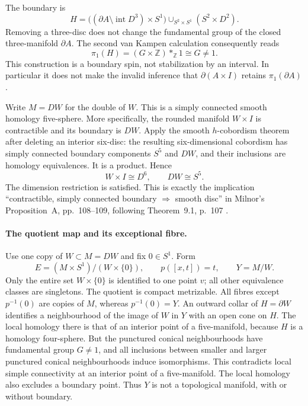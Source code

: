 The boundary is
\[
 H=\bigl((\partial A\setminus\operatorname{int}D^3)\times S^1\bigr)
       \mathop{\cup}_{S^2\times S^1}(S^2\times D^2).
 \tag{C5H.2}
\]
Removing a three-disc does not change the fundamental group of the closed
three-manifold $\partial A$.  The second van Kampen calculation consequently
reads
\[
 \pi_1(H)=(G\times\mathbb Z)*_{\mathbb Z}1\cong G\ne1.
\]
This construction is a boundary spin, not stabilization by an interval.
In particular it does not make the invalid inference that
$\partial(A\times I)$ retains $\pi_1(\partial A)$.

Write $M=DW$ for the double of $W$.  This is a simply connected smooth
homology five-sphere.  More specifically, the rounded manifold $W\times I$
is contractible and its boundary is $DW$.  Apply the smooth $h$-cobordism
theorem after deleting an interior six-disc: the resulting six-dimensional
cobordism has simply connected boundary components $S^5$ and $DW$, and their
inclusions are homology equivalences.  It is a product.  Hence
\[
 W\times I\cong D^6,\qquad DW\cong S^5.
 \tag{C5H.3}
\]
The dimension restriction is satisfied.  This is exactly the implication
``contractible, simply connected boundary $\Rightarrow$ smooth disc'' in
Milnor's Proposition~A, pp.~108--109, following Theorem~9.1, p.~107
\cite[\S9]{C5HMilnor1965}.

\paragraph{The quotient map and its exceptional fibre.}
Use one copy of $W\subset M=DW$ and fix $0\in S^1$.  Form
\[
 E=(M\times S^1)/(W\times\{0\}),\qquad
 p([x,t])=t,
 \qquad Y=M/W.
 \tag{C5H.4}
\]
Only the entire set $W\times\{0\}$ is identified to one point $v$; all
other equivalence classes are singletons.  The quotient is compact
metrizable.  All fibres except $p^{-1}(0)$ are copies of $M$, whereas
$p^{-1}(0)=Y$.  An outward collar of $H=\partial W$ identifies a neighbourhood
of the image of $W$ in $Y$ with an open cone on $H$.
The local homology there is that of an interior point of a five-manifold,
because $H$ is a homology four-sphere.  But the punctured conical
neighbourhoods have fundamental group $G\ne1$, and all inclusions between
smaller and larger punctured conical neighbourhoods induce isomorphisms.
This contradicts local simple connectivity at an interior point of a
five-manifold.  The local homology also excludes a boundary point.  Thus
$Y$ is not a topological manifold, with or without boundary.

